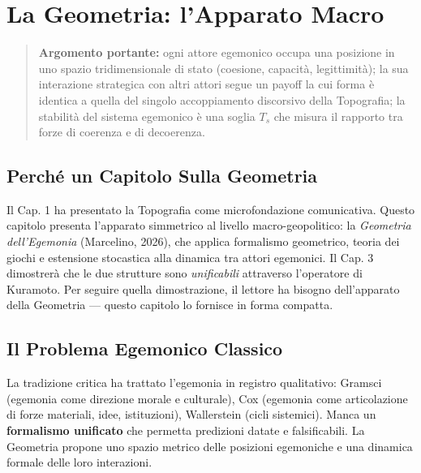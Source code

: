 \chapter{La Geometria: l'Apparato
Macro}\label{la-geometria-lapparato-macro}

\begin{quote}
\textbf{Argomento portante:} ogni attore egemonico occupa una posizione
in uno spazio tridimensionale di stato (coesione, capacità,
legittimità); la sua interazione strategica con altri attori segue un
payoff la cui forma è identica a quella del singolo accoppiamento
discorsivo della Topografia; la stabilità del sistema egemonico è una
soglia \(T_s\) che misura il rapporto tra forze di coerenza e di
decoerenza.
\end{quote}



\section{Perché un Capitolo Sulla
Geometria}\label{perchuxe9-un-capitolo-sulla-geometria}

Il Cap. 1 ha presentato la Topografia come microfondazione comunicativa.
Questo capitolo presenta l'apparato simmetrico al livello
macro-geopolitico: la \emph{Geometria dell'Egemonia} (Marcelino, 2026),
che applica formalismo geometrico, teoria dei giochi e estensione
stocastica alla dinamica tra attori egemonici. Il Cap. 3 dimostrerà che
le due strutture sono \emph{unificabili} attraverso l'operatore di
Kuramoto. Per seguire quella dimostrazione, il lettore ha bisogno
dell'apparato della Geometria --- questo capitolo lo fornisce in forma
compatta.



\section{Il Problema Egemonico
Classico}\label{il-problema-egemonico-classico}

La tradizione critica ha trattato l'egemonia in registro qualitativo:
Gramsci (egemonia come direzione morale e culturale), Cox (egemonia come
articolazione di forze materiali, idee, istituzioni), Wallerstein (cicli
sistemici). Manca un \textbf{formalismo unificato} che permetta
predizioni datate e falsificabili. La Geometria propone uno spazio
metrico delle posizioni egemoniche e una dinamica formale delle loro
interazioni.



